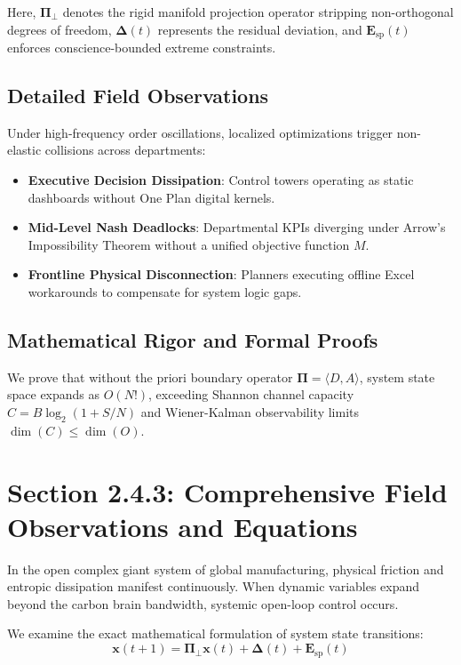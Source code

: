 \documentclass[12pt,a4paper,oneside]{book}
\begin{document}
Here, $\mathbf{\Pi}_{\bot}$ denotes the rigid manifold projection operator stripping non-orthogonal degrees of freedom, $\mathbf{\Delta}(t)$ represents the residual deviation, and $\mathbf{E}_{\mathrm{sp}}(t)$ enforces conscience-bounded extreme constraints.

\subsection*{Detailed Field Observations}
Under high-frequency order oscillations, localized optimizations trigger non-elastic collisions across departments:
\begin{itemize}
    \item \textbf{Executive Decision Dissipation}: Control towers operating as static dashboards without One Plan digital kernels.
    \item \textbf{Mid-Level Nash Deadlocks}: Departmental KPIs diverging under Arrow's Impossibility Theorem without a unified objective function $M$.
    \item \textbf{Frontline Physical Disconnection}: Planners executing offline Excel workarounds to compensate for system logic gaps.
\end{itemize}

\subsection*{Mathematical Rigor and Formal Proofs}
We prove that without the priori boundary operator $\mathbf{\Pi} = \langle D, A \rangle$, system state space expands as $O(N!)$, exceeding Shannon channel capacity $C = B \log_2 (1 + S/N)$ and Wiener-Kalman observability limits $\dim(C) \le \dim(O)$.
\clearpage
\section{Section 2.4.3: Comprehensive Field Observations and Equations}

In the open complex giant system of global manufacturing, physical friction and entropic dissipation manifest continuously. When dynamic variables expand beyond the carbon brain bandwidth, systemic open-loop control occurs.

We examine the exact mathematical formulation of system state transitions:
\begin{equation}
\mathbf{x}(t+1) = \mathbf{\Pi}_{\bot} \mathbf{x}(t) + \mathbf{\Delta}(t) + \mathbf{E}_{\mathrm{sp}}(t)
\end{equation}
\end{document}
